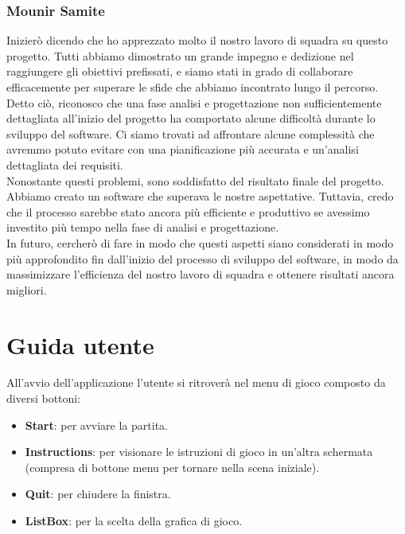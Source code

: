 \documentclass[a4paper,12pt]{report}
\begin{document}
\subsection*{Mounir Samite}
Inizierò dicendo che ho apprezzato molto il nostro lavoro di squadra su questo progetto. Tutti abbiamo dimostrato un grande impegno e dedizione nel raggiungere gli obiettivi prefissati, e siamo stati in grado di collaborare efficacemente per superare le sfide che abbiamo incontrato lungo il percorso.
\\
Detto ciò, riconosco che una fase analisi e progettazione non sufficientemente dettagliata all'inizio del progetto ha comportato alcune difficoltà durante lo sviluppo del software. Ci siamo trovati ad affrontare alcune complessità che avremmo potuto evitare con una pianificazione più accurata e un'analisi dettagliata dei requisiti.
\\
Nonostante questi problemi, sono soddisfatto del risultato finale del progetto. Abbiamo creato un software che superava le nostre aspettative. Tuttavia, credo che il processo sarebbe stato ancora più efficiente e produttivo se avessimo investito più tempo nella fase di analisi e progettazione.
\\
In futuro, cercherò di fare in modo che questi aspetti siano considerati in modo più approfondito fin dall'inizio del processo di sviluppo del software, in modo da massimizzare l'efficienza del nostro lavoro di squadra e ottenere risultati ancora migliori.



\chapter{Guida utente}

All'avvio dell'applicazione l'utente si ritroverà nel menu di gioco composto da diversi bottoni:
\begin{itemize}
    \item \textbf{Start}: per avviare la partita.
    \item \textbf{Instructions}: per visionare le istruzioni di gioco in un'altra schermata (compresa di bottone menu per tornare nella scena iniziale).
    \item \textbf{Quit}: per chiudere la finistra.
    \item \textbf{ListBox}: per la scelta della grafica di gioco.
\end{itemize}
\end{document}
